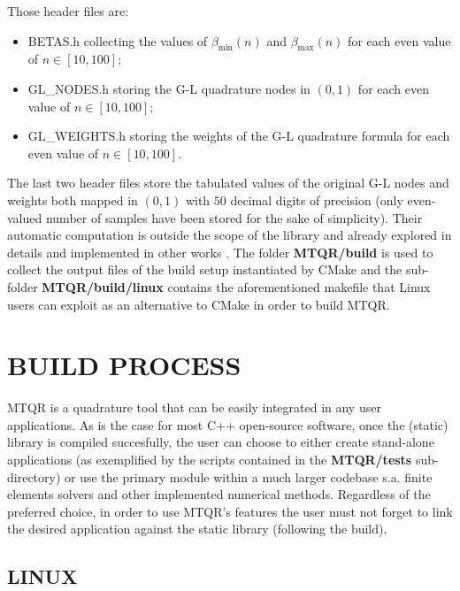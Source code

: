 \documentclass[a4paper, twosided]{book}
\begin{document}
\noindent 
 Those header files are:
\begin{itemize}
    \item \colorbox{poliGrayBlue}{BETAS.h} collecting the values of $\beta_{\text{min}}(n)$ and $\beta_{\text{max}}(n)$ for each even value of $n\in[10,100]$;
    \item \colorbox{poliGrayBlue}{GL\_NODES.h} storing the G-L quadrature nodes in $(0,1)$ for each even value of $n\in[10,100]$;
    \item \colorbox{poliGrayBlue}{GL\_WEIGHTS.h} storing the weights of the G-L quadrature formula for each even value of $n\in[10,100]$.
\end{itemize}
The last two header files store the tabulated values of the original G-L nodes and weights both mapped in $(0,1)$ with $50$ decimal digits of precision (only even-valued number of samples have been stored for the sake of simplicity). Their automatic computation is outside the scope of the library and already explored in details and implemented in other works \cite{Gautschi94,Hale13}. The folder \colorbox{poliGrayBlue}{\textbf{MTQR/build}} is used to collect the output files of the build setup instantiated by CMake and the sub-folder \colorbox{poliGrayBlue}{\textbf{MTQR/build/linux}} contains the aforementioned \colorbox{poliGrayBlue}{makefile} that Linux users can exploit as an alternative to CMake in order to build MTQR.

\section[Build process]{\changefont BUILD PROCESS}\label{Sec2.3}

\noindent
MTQR is a quadrature tool that can be easily integrated in any user applications. As is the case for most C++ open-source software, once the (static) library is compiled succesfully, the user can choose to either create stand-alone applications (as exemplified by the scripts contained in the \colorbox{poliGrayBlue}{\textbf{MTQR/tests}} sub-directory) or use the primary module within a much larger codebase s.a. finite elements solvers and other implemented numerical methods. Regardless of the preferred choice, in order to use MTQR's features the user must not forget to link the desired application against the static library (following the build).

\subsection[Linux]{\changefont LINUX}\label{SubSec2.3.1}
\end{document}
